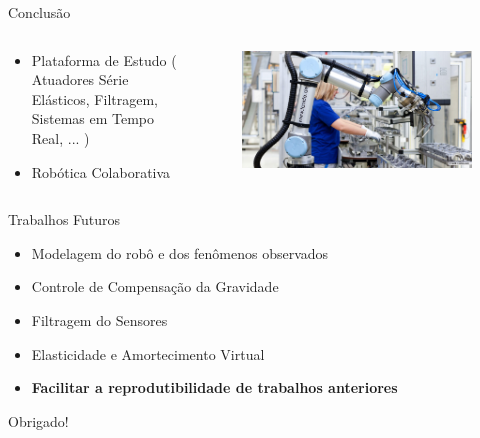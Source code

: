 \documentclass{beamer}
\begin{document}
\begin{frame}{Conclusão}
\begin{columns}
\begin{column}{0.4\textwidth}
\begin{itemize}
    \item Plataforma de Estudo ( Atuadores Série Elásticos, Filtragem, Sistemas em Tempo Real, ... )
    \item Robótica Colaborativa
\end{itemize}
\end{column}
\begin{column}{0.6\textwidth}  %
\begin{figure}
    \centering
    \includegraphics[width = \linewidth]{tex/figs/ur-production.jpg}
\end{figure}
\end{column}
\end{columns}
\end{frame}

\begin{frame}{Trabalhos Futuros}
\begin{itemize}
    \item Modelagem do robô e dos fenômenos observados
    \item Controle de Compensação da Gravidade
    \item Filtragem do Sensores
    \item Elasticidade e Amortecimento Virtual
    \item \textbf{Facilitar a reprodutibilidade de trabalhos anteriores}
\end{itemize}
\end{frame}

\begin{frame}{}
\centering
\Huge{Obrigado!}
\end{frame}


\end{document}
